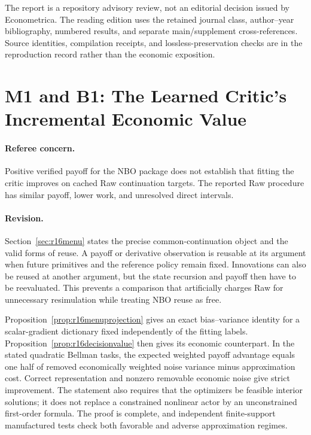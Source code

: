 The report is a repository advisory review, not an editorial decision issued by Econometrica. The reading edition uses the retained journal class, author--year bibliography, numbered results, and separate main/supplement cross-references. Source identities, compilation receipts, and lossless-preservation checks are in the reproduction record rather than the economic exposition.

\section{M1 and B1: The Learned Critic's Incremental Economic Value}
\paragraph*{Referee concern.} Positive verified payoff for the NBO package does not establish that fitting the critic improves on cached Raw continuation targets. The reported Raw procedure has similar payoff, lower work, and unresolved direct intervals.

\paragraph*{Revision.} Section~\ref{sec:r16menu} states the precise common-continuation object and the valid forms of reuse. A payoff or derivative observation is reusable at its argument when future primitives and the reference policy remain fixed. Innovations can also be reused at another argument, but the state recursion and payoff then have to be reevaluated. This prevents a comparison that artificially charges Raw for unnecessary resimulation while treating NBO reuse as free.

Proposition~\ref{prop:r16menuprojection} gives an exact bias--variance identity for a scalar-gradient dictionary fixed independently of the fitting labels. Proposition~\ref{prop:r16decisionvalue} then gives its economic counterpart. In the stated quadratic Bellman tasks, the expected weighted payoff advantage equals one half of removed economically weighted noise variance minus approximation cost. Correct representation and nonzero removable economic noise give strict improvement. The statement also requires that the optimizers be feasible interior solutions; it does not replace a constrained nonlinear actor by an unconstrained first-order formula. The proof is complete, and independent finite-support manufactured tests check both favorable and adverse approximation regimes.

